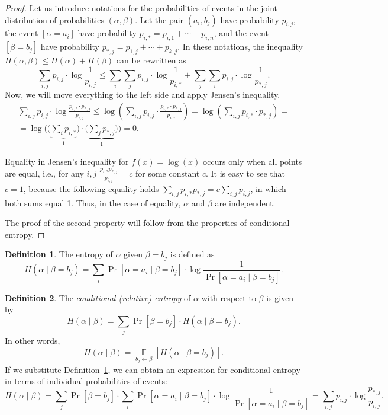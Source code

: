 \documentclass[12pt,sans]{article}
\DeclareMathOperator*{\E}{\mathbb{E}}
\theoremstyle{definition}
\newtheorem{definition}{Definition}[section]
\theoremstyle{plain}
\theoremstyle{remark}
\begin{document}
\begin{proof}
    Let us introduce notations for the probabilities of events in the joint distribution of probabilities \((\alpha, \beta)\). Let the pair \((a_i, b_j)\) have probability \(p_{i,j}\), the event \([\alpha = a_i]\) have probability \(p_{i,*} = p_{i,1} + \dotsb + p_{i,n}\), and the event \([\beta = b_j]\) have probability \(p_{*,j} = p_{1,j} + \dotsb + p_{k,j}\). In these notations, the inequality \(H(\alpha, \beta) \le H(\alpha) + H(\beta)\) can be rewritten as
    \[
    \sum_{i,j} p_{i,j} \cdot \log \frac{1}{p_{i,j}} \le
    \sum_{i} \sum_{j} p_{i,j} \cdot \log \frac{1}{p_{i,*}} +
    \sum_{j} \sum_{i} p_{i,j} \cdot \log \frac{1}{p_{*,j}}.
    \]
    Now, we will move everything to the left side and apply Jensen's inequality.
    \begin{multline*}
        \sum_{i,j} p_{i,j} \cdot \log \frac{p_{i,*} \cdot p_{*,j}}{p_{i,j}} \le
        \log\left(\sum_{i,j} p_{i,j} \cdot \frac{p_{i,*} \cdot p_{*,j}}{p_{i,j}}\right) =
        \log\left(\sum_{i,j} p_{i,*} \cdot p_{*,j}\right) = \\
        = \log \Biggl(\biggl(\underbrace{\sum_{i} p_{i,*}}_1\biggr) \cdot
        \biggl(\underbrace{\sum_{j} p_{*,j}}_1\biggr)\Biggr) = 0.
    \end{multline*}

    Equality in Jensen's inequality for \(f(x) = \log(x)\) occurs only when all points are equal, i.e., for any \(i,j\) \(\frac{p_{i,*} p_{*,j}}{p_{i,j}} = c\) for some constant \(c\). It is easy to see that \(c = 1\), because the following equality holds \(\sum_{i,j} {p_{i,*} p_{*,j}} = c \sum_{i,j} {p_{i,j}}\), in which both sums equal 1. Thus, in the case of equality, \(\alpha\) and \(\beta\) are independent.

    The proof of the second property will follow from the properties of conditional entropy.
\end{proof}


\begin{definition}\label{def:cond-entropy1}
    The entropy of \(\alpha\) given \(\beta = b_j\) is defined as
    \[
    H(\alpha\mid\beta = b_j) = \sum_i \Pr[\alpha = a_i\mid \beta = b_j] \cdot
    \log\frac{1}{\Pr[\alpha = a_i\mid \beta = b_j]}.
    \]
\end{definition}

\begin{definition}\label{def:cond-entropy2}
    The \emph{conditional (relative) entropy} of \(\alpha\) with respect to \(\beta\) is given by
    \[
    H(\alpha\mid\beta) = \sum_j \Pr[\beta = b_j] \cdot H(\alpha\mid \beta = b_j).
    \]
    In other words,
    \[
    H(\alpha\mid\beta) = \E\limits_{b_j \gets \beta}[H(\alpha\mid \beta = b_j)].
    \]
    If we substitute Definition~\ref{def:cond-entropy1}, we can obtain an expression for conditional entropy in terms of individual probabilities of events:
    \[
    H(\alpha\mid\beta) =
    \sum_j \Pr[\beta = b_j] \cdot
    \sum_i \Pr[\alpha = a_i\mid \beta = b_j] \cdot
    \log\frac{1}{\Pr[\alpha = a_i\mid \beta = b_j]}  =
    \sum_{i,j} p_{i,j} \cdot \log\frac{p_{*,j}}{p_{i,j}}.
    \]
\end{definition}
\end{document}
